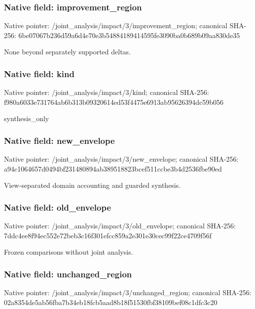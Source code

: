 \documentclass[10pt,a4paper]{article}
\begin{document}
\subsubsection{Native field: improvement\_\allowbreak{}region}
Native pointer: /joint\_\allowbreak{}analysis/impact/3/improvement\_\allowbreak{}region; canonical SHA-256: 6be07067b236d59a6d4e70e3b54884189414595fe3090ba0b689b09aa830de35

\begingroup\raggedright\sloppy None beyond separately supported deltas.\par\endgroup

\subsubsection{Native field: kind}
Native pointer: /joint\_\allowbreak{}analysis/impact/3/kind; canonical SHA-256: f980a6033e731764ab6b313b09320614ed53f4475e6913ab95626394dc59b056

\begingroup\raggedright\sloppy synthesis\_\allowbreak{}only\par\endgroup

\subsubsection{Native field: new\_\allowbreak{}envelope}
Native pointer: /joint\_\allowbreak{}analysis/impact/3/new\_\allowbreak{}envelope; canonical SHA-256: a94c1064657d0494bf231480894ab389518823bcef511ccbe3b4d2536fbe90ed

\begingroup\raggedright\sloppy View-separated domain accounting and guarded synthesis.\par\endgroup

\subsubsection{Native field: old\_\allowbreak{}envelope}
Native pointer: /joint\_\allowbreak{}analysis/impact/3/old\_\allowbreak{}envelope; canonical SHA-256: 7ddc4ee8f94ec552e72beb3c16f301efcc859a2e301e30cec99f22ce4709f56f

\begingroup\raggedright\sloppy Frozen comparisons without joint analysis.\par\endgroup

\subsubsection{Native field: unchanged\_\allowbreak{}region}
Native pointer: /joint\_\allowbreak{}analysis/impact/3/unchanged\_\allowbreak{}region; canonical SHA-256: 02a8354de5ab56fba7b34eb18fcb5aad8b18f51530fbf38109bef08c1dfc3c20
\end{document}
